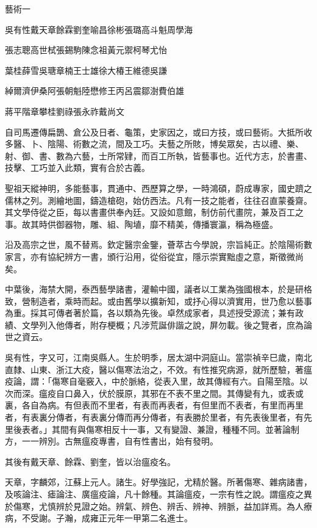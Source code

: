
\begin{pinyinscope}
藝術一

吳有性戴天章餘霖劉奎喻昌徐彬張璐高斗魁周學海

張志聰高世栻張錫駒陳念祖黃元禦柯琴尤怡

葉桂薛雪吳瑭章楠王士雄徐大椿王維德吳謙

綽爾濟伊桑阿張朝魁陸懋修王丙呂震鄒澍費伯雄

蔣平階章攀桂劉祿張永祚戴尚文

自司馬遷傳扁鵲、倉公及日者、龜策，史家因之，或曰方技，或曰藝術。大抵所收多醫、卜、陰陽、術數之流，間及工巧。夫藝之所賅，博矣眾矣，古以禮、樂、射、御、書、數為六藝，士所常肄，而百工所執，皆藝事也。近代方志，於書畫、技擊、工巧並入此類，實有合於古義。

聖祖天縱神明，多能藝事，貫通中、西歷算之學，一時鴻碩，蔚成專家，國史躋之儒林之列。測繪地圖，鑄造槍砲，始仿西法。凡有一技之能者，往往召直蒙養齋。其文學侍從之臣，每以書畫供奉內廷。又設如意館，制仿前代畫院，兼及百工之事。故其時供御器物，雕、組、陶埴，靡不精美，傳播寰瀛，稱為極盛。

沿及高宗之世，風不替焉。欽定醫宗金鑒，薈萃古今學說，宗旨純正。於陰陽術數家言，亦有協紀辨方一書，頒行沿用，從俗從宜，隱示崇實黜虛之意，斯徵微尚矣。

中葉後，海禁大開，泰西藝學諸書，灌輸中國，議者以工業為強國根本，於是研格致，營制造者，乘時而起。或由舊學以擴新知，或抒心得以濟實用，世乃愈以藝事為重。採其可傳者著於篇，各以類為先後。卓然成家者，具述授受源流；兼有政績、文學列入他傳者，附存梗概；凡涉荒誕俳諧之說，屏勿載。後之覽者，庶為論世之資云。

吳有性，字又可，江南吳縣人。生於明季，居太湖中洞庭山。當崇禎辛巳歲，南北直隸、山東、浙江大疫，醫以傷寒法治之，不效。有性推究病源，就所歷驗，著瘟疫論，謂：「傷寒自毫竅入，中於脈絡，從表入里，故其傳經有六。自陽至陰。以次而深。瘟疫自口鼻入，伏於膜原，其邪在不表不里之間。其傳變有九，或表或裏，各自為病。有但表而不里者，有表而再表者，有但里而不表者，有里而再里者，有表裏分傳者，有表裏分傳而再分傳者，有表勝於里者，有先表後里者，有先里後表者。」其間有與傷寒相反十一事，又有變證、兼證，種種不同。並著論制方，一一辨別。古無瘟疫專書，自有性書出，始有發明。

其後有戴天章、餘霖、劉奎，皆以治瘟疫名。

天章，字麟郊，江蘇上元人。諸生。好學強記，尤精於醫。所著傷寒、雜病諸書，及咳論注、瘧論注、廣瘟疫論，凡十餘種。其論瘟疫，一宗有性之說。謂瘟疫之異於傷寒，尤慎辨於見證之始。辨氣、辨色、辨舌、辨神、辨脈，益加詳焉。為人療病，不受謝。子瀚，成雍正元年一甲第二名進士。


\end{pinyinscope}
